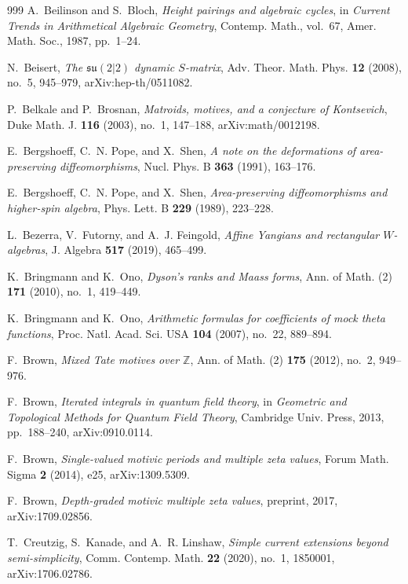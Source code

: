 \documentclass[11pt]{memoir}
\begin{document}
\begin{thebibliography}{999}
A.~Beilinson and S.~Bloch, \emph{Height pairings and algebraic cycles}, in \emph{Current Trends in Arithmetical Algebraic Geometry}, Contemp. Math., vol.~67, Amer. Math. Soc., 1987, pp.~1--24.

N.~Beisert, \emph{The $\mathfrak{su}(2|2)$ dynamic $S$-matrix}, Adv. Theor. Math. Phys. \textbf{12} (2008), no.~5, 945--979, arXiv:hep-th/0511082.

P.~Belkale and P.~Brosnan, \emph{Matroids, motives, and a conjecture of Kontsevich}, Duke Math. J. \textbf{116} (2003), no.~1, 147--188, arXiv:math/0012198.

E.~Bergshoeff, C.~N. Pope, and X.~Shen, \emph{A note on the deformations of area-preserving diffeomorphisms}, Nucl. Phys. B \textbf{363} (1991), 163--176.

E.~Bergshoeff, C.~N. Pope, and X.~Shen, \emph{Area-preserving diffeomorphisms and higher-spin algebra}, Phys. Lett. B \textbf{229} (1989), 223--228.

L.~Bezerra, V.~Futorny, and A.~J. Feingold, \emph{Affine Yangians and rectangular $W$-algebras}, J. Algebra \textbf{517} (2019), 465--499.

K.~Bringmann and K.~Ono, \emph{Dyson's ranks and Maass forms}, Ann. of Math. (2) \textbf{171} (2010), no.~1, 419--449.

K.~Bringmann and K.~Ono, \emph{Arithmetic formulas for coefficients of mock theta functions}, Proc. Natl. Acad. Sci. USA \textbf{104} (2007), no.~22, 889--894.

F.~Brown, \emph{Mixed Tate motives over $\mathbb Z$}, Ann. of Math. (2) \textbf{175} (2012), no.~2, 949--976.

F.~Brown, \emph{Iterated integrals in quantum field theory}, in \emph{Geometric and Topological Methods for Quantum Field Theory}, Cambridge Univ. Press, 2013, pp.~188--240, arXiv:0910.0114.

F.~Brown, \emph{Single-valued motivic periods and multiple zeta values}, Forum Math. Sigma \textbf{2} (2014), e25, arXiv:1309.5309.

F.~Brown, \emph{Depth-graded motivic multiple zeta values}, preprint, 2017, arXiv:1709.02856.

T.~Creutzig, S.~Kanade, and A.~R. Linshaw, \emph{Simple current extensions beyond semi-simplicity}, Comm. Contemp. Math. \textbf{22} (2020), no.~1, 1850001, arXiv:1706.02786.


\end{thebibliography}
\end{document}
